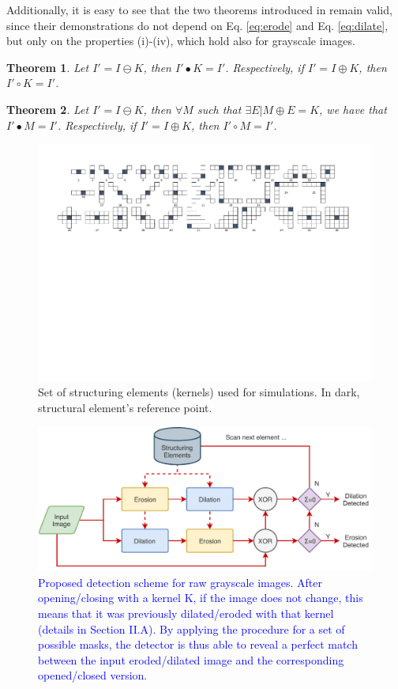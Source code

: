 \documentclass{ieeeaccess}
\newtheorem{theorem}{Theorem}
\begin{document}
Additionally, it is easy to see that the two theorems introduced in \cite{de2017detecting} remain valid, since their demonstrations do not depend on Eq. \ref{eq:erode} and Eq. \ref{eq:dilate}, but only on the properties (i)-(iv), which hold also for grayscale images.

\begin{theorem}
	\label{theorem_1}
	Let $I' = I \ominus K$, then $I'\bullet K = I'$. Respectively, if $I' = I \oplus K$, then $I'\circ K = I'$.
\end{theorem}

\begin{theorem}
	\label{theorem_2}
	Let $I' = I \ominus K$, then $\forall M$ such that $\exists E | M \oplus E = K$, we have that $I' \bullet M = I'$. Respectively, if $I' = I \oplus K$, then $I' \circ M = I'$.
\end{theorem}

\begin{figure}[h!]
	\centering
	\includegraphics[width=\linewidth]{kernels}
	\caption{Set of structuring elements (kernels) used for simulations. In dark, structural element's reference point.}
	\label{fig:masks}
\end{figure}
\begin{figure}[h]
	\centering
	\includegraphics[width=0.7\linewidth]{diagram1}
	\caption{\textcolor{blue}{Proposed detection scheme for raw grayscale images. After opening/closing with a kernel K, if the image does not change, this means that it was previously dilated/eroded with that kernel (details in Section II.A). By applying the procedure for a set of possible masks, the detector is thus able to reveal a perfect match between the input eroded/dilated image and the corresponding opened/closed version.}}
	\label{fig:scheme}
\end{figure}
\end{document}

